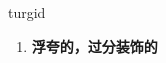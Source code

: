 
\begin{frame}
{\huge turgid}
\begin{center}
\begin{enumerate}\Large
  \item \textbf{浮夸的，过分装饰的}
\end{enumerate}
\end{center}
\end{frame}
